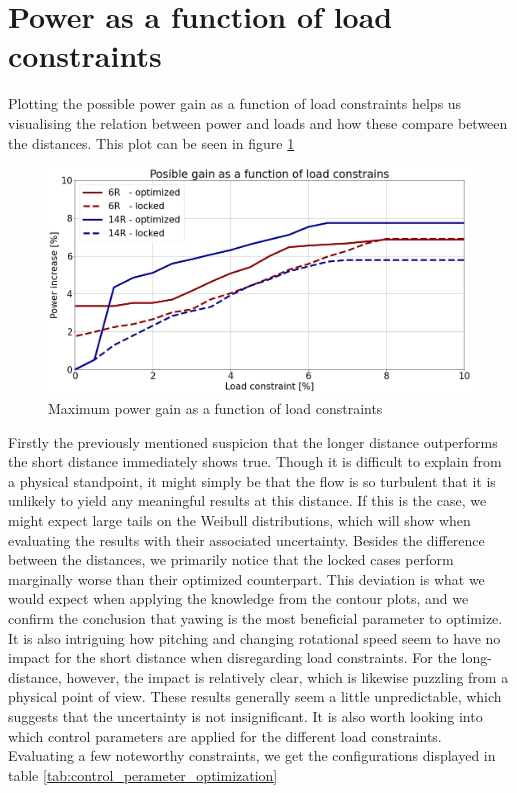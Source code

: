 \section{Power as a function of load constraints}

Plotting the possible power gain as a function of load constraints helps us visualising the relation between power and loads and how these compare between the distances. This plot can be seen in figure \ref{fig:power_as_function_of_constrains} 

\begin{figure}[H]
    \centering
    \includegraphics[scale=0.24]{Illustrations/power_constraint_plot.png}
    \caption{Maximum power gain as a function of load constraints}
    \label{fig:power_as_function_of_constrains}
\end{figure}

Firstly the previously mentioned suspicion that the longer distance outperforms the short distance immediately shows true. Though it is difficult to explain from a physical standpoint, it might simply be that the flow is so turbulent that it is unlikely to yield any meaningful results at this distance. If this is the case, we might expect large tails on the Weibull distributions, which will show when evaluating the results with their associated uncertainty. Besides the difference between the distances, we primarily notice that the locked cases perform marginally worse than their optimized counterpart. This deviation is what we would expect when applying the knowledge from the contour plots, and we confirm the conclusion that yawing is the most beneficial parameter to optimize. It is also intriguing how pitching and changing rotational speed seem to have no impact for the short distance when disregarding load constraints. For the long-distance, however, the impact is relatively clear, which is likewise puzzling from a physical point of view. These results generally seem a little unpredictable, which suggests that the uncertainty is not insignificant. It is also worth looking into which control parameters are applied for the different load constraints. Evaluating a few noteworthy constraints, we get the configurations displayed in table \ref{tab:control_perameter_optimization}






